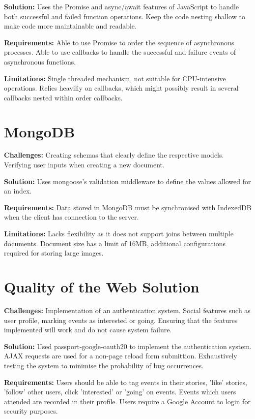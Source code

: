 \documentclass[11pt, a4paper]{article}
\begin{document}
\textbf{Solution:} Uses the Promise and async/await features of JavaScript to handle both successful
and failed function operations. Keep the code nesting shallow to make code more maintainable and
readable.

\textbf{Requirements:} Able to use Promise to order the sequence of asynchronous processes. Able to
use callbacks to handle the successful and failure events of asynchronous functions.

\textbf{Limitations:} Single threaded mechanism, not suitable for CPU-intensive operations. Relies
heaviliy on callbacks, which might possibly result in several callbacks nested within order
callbacks.

\section{MongoDB}
\textbf{Challenges:} Creating schemas that clearly define the respective models. Verifying user
inputs when creating a new document. 

\textbf{Solution:} Uses mongoose's validation middleware \cite{validation} to define the values
allowed for an index.

\textbf{Requirements:} Data stored in MongoDB must be synchronised with IndexedDB when the client
has connection to the server.

\textbf{Limitations:} Lacks flexibility as it does not support joins between multiple documents.
Document size has a limit of 16MB, additional configurations required for storing large images.

\section{Quality of the Web Solution}
\textbf{Challenges:} Implementation of an authentication system. Social features such as user
profile, marking events as interested or going. Ensuring that the features implemented will work and
do not cause system failure.

\textbf{Solution:} Used passport-google-oauth20 \cite{passport_google} to implement the
authentication system. AJAX requests are used for a non-page reload form submittion. Exhaustively
testing the system to minimise the probability of bug occurrences.

\textbf{Requirements:} Users should be able to tag events in their stories, 'like' stories, 'follow'
other users, click 'interested' or 'going' on events. Events which users attended are recorded in
their profile. Users require a Google Account to login for security purposes.
\end{document}
